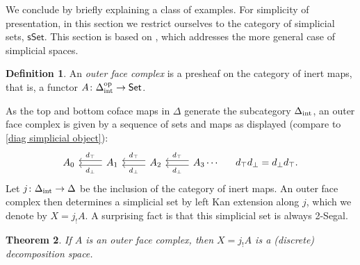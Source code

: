 \documentclass{conm-p-l}
\newtheorem{theorem}{Theorem}[section]
\theoremstyle{definition}
\newtheorem{definition}[theorem]{Definition}
\theoremstyle{remark}
\newcommand{\set}{\mathsf{Set}}
\newcommand{\sset}{\mathsf{sSet}}
\newcommand{\op}{\textup{op}}
\newcommand{\intrm}{\textup{int}}
\newcommand{\delint}{\Delta_\intrm}
\begin{document}
We conclude by briefly explaining a class of examples.
For simplicity of presentation, in this section we restrict ourselves to the category of simplicial sets, $\sset$. 
This section is based on \cite{HackneyKock:FDS}, which addresses the more general case of simplicial spaces.

\begin{definition}
An \emph{outer face complex} is a presheaf on the category of inert maps, that is, a functor $A \colon \delint^\op \to \set$.
\end{definition}

As the top and bottom coface maps in $\Delta$ generate the subcategory $\delint$, an outer face complex is given by a sequence of sets and maps as displayed (compare to \eqref{diag simplicial object}):
\begin{equation}
\begin{tikzcd}
A_0 & A_1 \lar[shift left, "d_\bot"] \lar[shift right, "d_\top"']  & A_2 \lar[shift left, "d_\bot"] \lar[shift right, "d_\top"']
 &
A_3 
\lar[shift left, "d_\bot"] \lar[shift right, "d_\top"'] \cdots &[-0.5cm] d_\top d_\bot = d_\bot d_\top.
\end{tikzcd} \end{equation}
Let $j\colon \delint \to \Delta$ be the inclusion of the category of inert maps.
An outer face complex then determines a simplicial set by left Kan extension along $j$, which we denote by $X = j_! A$.
A surprising fact is that this simplicial set is always 2-Segal.

\begin{theorem}
If $A$ is an outer face complex, then $X = j_! A$ is a (discrete) decomposition space.
\end{theorem}
\end{document}
